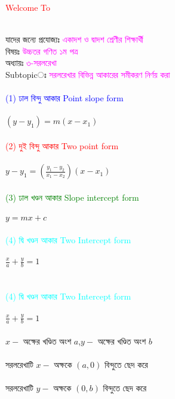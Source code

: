 \documentclass{article}
\begin{document}
 
	\Large
	\textcolor{red}{Welcome To} 
	\\
	\\
	যাদের জন্যে প্রযোজ্যঃ  	\textcolor{magenta}{একাদশ ও দ্বাদশ শ্রেণীর শিক্ষার্থী} \\
	বিষয়ঃ \textcolor{magenta}{উচ্চতর গণিত ১ম পত্র} \\
	অধ্যায়ঃ \textcolor{magenta}{৩-সরলরেখা}\\ 
	Subtopicঃ  \textcolor{magenta}{  সরলরেখার বিভিন্ন আকারের সমীকরণ নির্ণয় করা   }\\
	\\
	\textcolor{blue}{(1)	ঢাল বিন্দু আকার Point slope form}\\
	\\
	$(y-y_1)=m(x-x_1)$\\
	\\
	\textcolor{red} {(2)  দুই বিন্দু আকার 	Two point form}\\
	\\
	$y-y_1=\left(\frac{y_1-y_2}{x_1-x_2}\right)(x-x_1)$\\
	\\
	\textcolor{green}{ (3) ঢাল খণ্ডন আকার 	Slope intercept form}\\
	\\
	$y=mx+c$\\
	\\
	\textcolor{cyan}{ (4) দ্বি খণ্ডন আকার  Two	Intercept form}\\
	\\
	$\frac{x}{a}+\frac{y}{b}=1$\\
	\\
	\vspace{6cm}
	\\
	\textcolor{cyan}{ (4) দ্বি খণ্ডন আকার  Two	Intercept form}\\
\\
$\frac{x}{a}+\frac{y}{b}=1$\\
	\\
	$x-$ অক্ষের খণ্ডিত অংশ $a$,\qquad $y-$ অক্ষের খণ্ডিত অংশ $b$\\
	\\ 
	সরলরেখাটি $x-$ অক্ষকে $(a,0)$ বিন্দুতে  ছেদ করে\\
	\\
		সরলরেখাটি $y-$ অক্ষকে $(0,b)$ বিন্দুতে ছেদ করে\\
		\\ 
\end{document}
